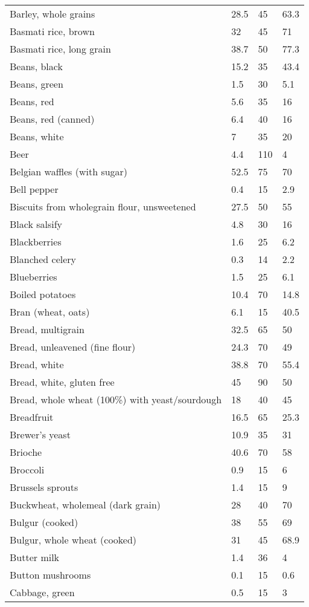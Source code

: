 \documentclass[../main.tex]{subfiles}
\begin{document}
\begin{longtable}{llll}
Barley, whole grains & 28.5 & 45 & 63.3 \\
Basmati rice, brown & 32 & 45 & 71 \\
Basmati rice, long grain & 38.7 & 50 & 77.3 \\
Beans, black & 15.2 & 35 & 43.4 \\
Beans, green & 1.5 & 30 & 5.1 \\
Beans, red & 5.6 & 35 & 16 \\
Beans, red (canned) & 6.4 & 40 & 16 \\
Beans, white & 7 & 35 & 20 \\
Beer & 4.4 & 110 & 4 \\
Belgian waffles (with sugar) & 52.5 & 75 & 70 \\
Bell pepper & 0.4 & 15 & 2.9 \\
Biscuits from wholegrain flour, unsweetened & 27.5 & 50 & 55 \\
Black salsify & 4.8 & 30 & 16 \\
Blackberries & 1.6 & 25 & 6.2 \\
Blanched celery & 0.3 & 14 & 2.2 \\
Blueberries & 1.5 & 25 & 6.1 \\
Boiled potatoes & 10.4 & 70 & 14.8 \\
Bran (wheat, oats) & 6.1 & 15 & 40.5 \\
Bread, multigrain & 32.5 & 65 & 50 \\
Bread, unleavened (fine flour) & 24.3 & 70 & 49 \\
Bread, white & 38.8 & 70 & 55.4 \\
Bread, white, gluten free & 45 & 90 & 50 \\
Bread, whole wheat (100\%) with yeast/sourdough & 18 & 40 & 45 \\
Breadfruit & 16.5 & 65 & 25.3 \\
Brewer’s yeast & 10.9 & 35 & 31 \\
Brioche  & 40.6 & 70 & 58 \\
Broccoli & 0.9 & 15 & 6 \\
Brussels sprouts & 1.4 & 15 & 9 \\
Buckwheat, wholemeal (dark grain) & 28 & 40 & 70 \\
Bulgur (cooked) & 38 & 55 & 69 \\
Bulgur, whole wheat (cooked) & 31 & 45 & 68.9 \\
Butter milk & 1.4 & 36 & 4 \\
Button mushrooms & 0.1 & 15 & 0.6 \\
Cabbage, green & 0.5 & 15 & 3 \\

\end{longtable}
\end{document}
